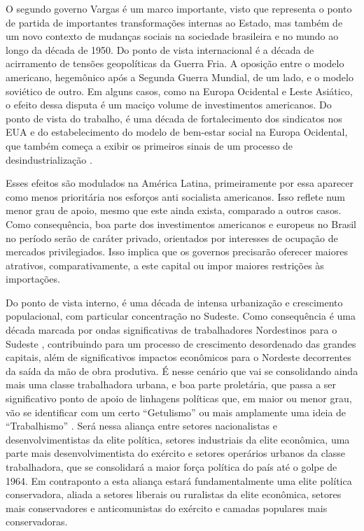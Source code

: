 O segundo governo Vargas é um marco importante, visto que
representa o ponto de partida de importantes transformações internas ao
Estado, mas também de um novo contexto de mudanças sociais na sociedade
brasileira e no mundo ao longo da década de 1950. Do ponto de vista
internacional é a década de acirramento de tensões geopolíticas da
Guerra Fria. A oposição entre o modelo americano, hegemônico
após a Segunda Guerra Mundial, de um lado, e o modelo soviético de
outro. Em alguns casos, como na
Europa Ocidental e Leste Asiático, o efeito dessa disputa é um maciço volume de
investimentos americanos. Do ponto de vista do trabalho, é uma década de
fortalecimento dos sindicatos nos EUA e do estabelecimento do modelo de
bem-estar social na Europa Ocidental, que também começa a exibir os
primeiros sinais de um processo de desindustrialização .

Esses efeitos são modulados na América Latina, primeiramente por essa
aparecer como menos prioritária nos esforços anti socialista americanos.
Isso reflete num menor grau de apoio, mesmo que este ainda exista,
comparado a outros casos. Como consequência, boa parte dos investimentos
americanos e europeus no Brasil no período serão de caráter privado,
orientados por interesses de ocupação de mercados privilegiados. Isso
implica que os governos precisarão oferecer maiores atrativos,
comparativamente, a este capital ou impor maiores restrições às
importações.

Do ponto de vista interno, é uma década de intensa urbanização e
crescimento populacional, com particular concentração no Sudeste. Como
consequência é uma década marcada por ondas significativas de
trabalhadores Nordestinos para o Sudeste \citep[]{fontes_migration_2016},
contribuindo para um processo de crescimento desordenado das grandes capitais, além de
significativos impactos econômicos para o Nordeste decorrentes da saída
da mão de obra produtiva. É nesse cenário que vai se consolidando ainda
mais uma classe trabalhadora urbana, e boa parte proletária, que
passa a ser significativo ponto de apoio de linhagens políticas que, em
maior ou menor grau, vão se identificar com um certo ``Getulismo''
 ou mais amplamente uma ideia de ``Trabalhismo''  .
Será nessa aliança entre setores nacionalistas e desenvolvimentistas da elite
política, setores industriais da elite econômica, uma parte mais
desenvolvimentista do exército e setores operários urbanos da classe
trabalhadora, que se consolidará a maior força política do país até o
golpe de 1964. Em contraponto a esta aliança estará fundamentalmente uma
elite política conservadora, aliada a setores liberais ou ruralistas da
elite econômica, setores mais conservadores e anticomunistas do exército
e camadas populares mais conservadoras.

